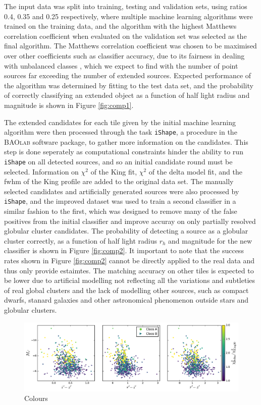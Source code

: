 \documentclass[useAMS,usenatbib]{mn2e}
\begin{document}
The input data was split into training, testing and validation sets, using ratios 0.4, 0.35 and 0.25 respectively, where multiple machine learning algorithms were trained on the training data, and the algorithm with the highest Matthews correlation coefficient\citep{matthews1975comparison} when evaluated on the validation set was selected as the final algorithm. The Matthews correlation coefficient was chosen to be maximised over other coefficients such as classifier accuracy, due to its fairness in dealing with unbalanced classes \citep{Baldi2000, Jurman2012}, which we expect to find with the number of point sources far exceeding the number of extended sources. Expected performance of the algorithm was determined by fitting to the test data set, and the probability of correctly classifying an extended object as a function of half light radius and magnitude is shown in Figure \ref{fig:comp1}.

The extended candidates for each tile given by the initial machine learning algorithm were then processed through the task \verb|iShape|, a procedure in the \textsc{BAOlab} software package, to gather more information on the candidates. This step is done seperately as computational constraints hinder the ability to run \verb|iShape| on all detected sources, and so an initial candidate round must be selected. Information on $\chi^2$ of the King fit, $\chi^2$ of the delta model fit, and the fwhm of the King profile are added to the original data set. The manually selected candidates and artificially generated sources were also processed by \verb|iShape|, and the improved dataset was used to train a second classifier in a similar fashion to the first, which was designed to remove many of the false positives from the initial classifier and improve accuray on only partially resolved globular cluster candidates. The probability of detecting a source as a globular cluster correctly, as a function of half light radius $r_h$ and magnitude for the new classifier is shown in Figure \ref{fig:comp2}. It important to note that the success rates shown in Figure \ref{fig:comp2} cannot be directly applied to the real data and thus only provide estaimtes. The matching accuracy on other tiles is expected to be lower due to artificial modelling not reflecting all the variations and subtleties of real global clusters and the lack of modelling other sources, such as compact dwarfs, stanard galaxies and other astronomical phenomenon outside stars and globular clusters. 

\begin{figure}[h]
	\includegraphics[width=\textwidth]{images/colour.pdf}
	\caption{Colours}
	\label{fig:colour}
\end{figure}
\end{document}
